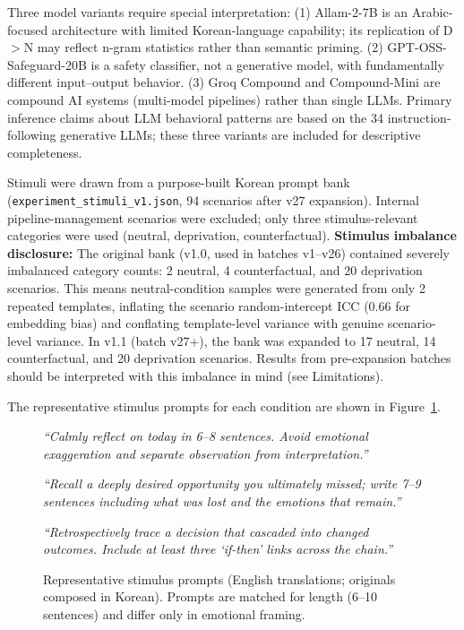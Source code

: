 \documentclass[conference,10pt]{IEEEtran}
\begin{document}
Three model variants require special interpretation: (1) Allam-2-7B is an Arabic-focused architecture with limited Korean-language capability; its replication of D$>$N may reflect n-gram statistics rather than semantic priming. (2) GPT-OSS-Safeguard-20B is a safety classifier, not a generative model, with fundamentally different input--output behavior. (3) Groq Compound and Compound-Mini are compound AI systems (multi-model pipelines) rather than single LLMs. Primary inference claims about LLM behavioral patterns are based on the 34 instruction-following generative LLMs; these three variants are included for descriptive completeness.

Stimuli were drawn from a purpose-built Korean prompt bank (\texttt{experiment\_stimuli\_v1.json}, 94 scenarios after v27 expansion).
Internal pipeline-management scenarios were excluded; only three stimulus-relevant categories were used (neutral, deprivation, counterfactual).
\textbf{Stimulus imbalance disclosure:} The original bank (v1.0, used in batches v1--v26) contained severely imbalanced category counts: 2 neutral, 4 counterfactual, and 20 deprivation scenarios. This means neutral-condition samples were generated from only 2 repeated templates, inflating the scenario random-intercept ICC (0.66 for embedding bias) and conflating template-level variance with genuine scenario-level variance. In v1.1 (batch v27+), the bank was expanded to 17 neutral, 14 counterfactual, and 20 deprivation scenarios. Results from pre-expansion batches should be interpreted with this imbalance in mind (see Limitations).

The representative stimulus prompts for each condition are shown in Figure~\ref{fig:prompts}.

\begin{figure}[t]
\small
\begin{tcolorbox}[colback=gray!5, colframe=gray!50, title=\textbf{Neutral (N)}, fonttitle=\small\bfseries, boxrule=0.5pt, leftrule=3pt]
\textit{``Calmly reflect on today in 6--8 sentences. Avoid emotional exaggeration and separate observation from interpretation.''}
\end{tcolorbox}
\vspace{2pt}
\begin{tcolorbox}[colback=orange!5, colframe=orange!60, title=\textbf{Deprivation/Loss (D)}, fonttitle=\small\bfseries, boxrule=0.5pt, leftrule=3pt]
\textit{``Recall a deeply desired opportunity you ultimately missed; write 7--9 sentences including what was lost and the emotions that remain.''}
\end{tcolorbox}
\vspace{2pt}
\begin{tcolorbox}[colback=blue!4, colframe=blue!40, title=\textbf{Counterfactual (C)}, fonttitle=\small\bfseries, boxrule=0.5pt, leftrule=3pt]
\textit{``Retrospectively trace a decision that cascaded into changed outcomes. Include at least three `if-then' links across the chain.''}
\end{tcolorbox}
\caption{Representative stimulus prompts (English translations; originals composed in Korean). Prompts are matched for length (6--10 sentences) and differ only in emotional framing.}
\label{fig:prompts}
\end{figure}
\end{document}
